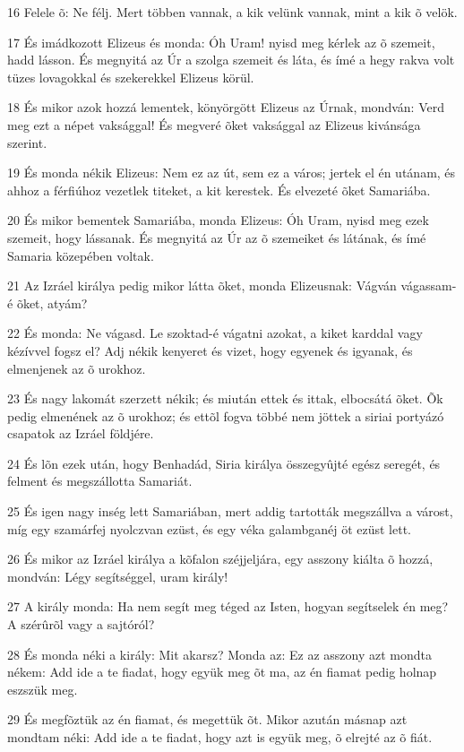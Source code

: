 \par 16 Felele õ: Ne félj. Mert többen vannak, a kik velünk vannak, mint a kik õ velök.
\par 17 És imádkozott Elizeus és monda: Óh Uram! nyisd meg kérlek az õ szemeit, hadd lásson. És megnyitá az Úr a szolga szemeit és láta, és ímé a hegy rakva volt tüzes lovagokkal és szekerekkel Elizeus körül.
\par 18 És mikor azok hozzá lementek, könyörgött Elizeus az Úrnak, mondván: Verd meg ezt a népet vaksággal! És megveré õket vaksággal az Elizeus kivánsága szerint.
\par 19 És monda nékik Elizeus: Nem ez az út, sem ez a város; jertek el én utánam, és ahhoz a férfiúhoz vezetlek titeket, a kit kerestek. És elvezeté õket Samariába.
\par 20 És mikor bementek Samariába, monda Elizeus: Óh Uram, nyisd meg ezek szemeit, hogy lássanak. És megnyitá az Úr az õ szemeiket és látának, és ímé Samaria közepében voltak.
\par 21 Az Izráel királya pedig mikor látta õket, monda Elizeusnak: Vágván vágassam-é õket, atyám?
\par 22 És monda: Ne vágasd. Le szoktad-é vágatni azokat, a kiket karddal vagy kézívvel fogsz el? Adj nékik kenyeret és vizet, hogy egyenek és igyanak, és elmenjenek az õ urokhoz.
\par 23 És nagy lakomát szerzett nékik; és miután ettek és ittak, elbocsátá õket. Õk pedig elmenének az õ urokhoz; és ettõl fogva többé nem jöttek a siriai portyázó csapatok az Izráel földjére.
\par 24 És lõn ezek után, hogy Benhadád, Siria királya összegyûjté egész seregét, és felment és megszállotta Samariát.
\par 25 És igen nagy inség lett Samariában, mert addig tartották megszállva a várost, míg egy szamárfej nyolczvan ezüst, és egy véka galambganéj öt ezüst lett.
\par 26 És mikor az Izráel királya a kõfalon széjjeljára, egy asszony kiálta õ hozzá, mondván: Légy segítséggel, uram király!
\par 27 A király monda: Ha nem segít meg téged az Isten, hogyan segítselek én meg? A szérûrõl vagy a sajtóról?
\par 28 És monda néki a király: Mit akarsz? Monda az: Ez az asszony azt mondta nékem: Add ide a te fiadat, hogy együk meg õt ma, az én fiamat pedig holnap eszszük meg.
\par 29 És megfõztük az én fiamat, és megettük õt. Mikor azután másnap azt mondtam néki: Add ide a te fiadat, hogy azt is együk meg, õ elrejté az õ fiát.
